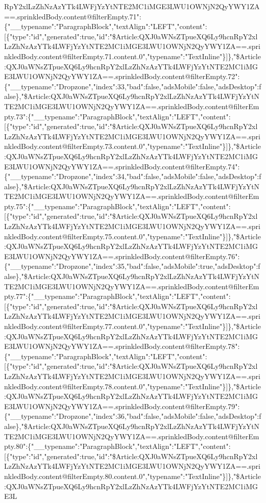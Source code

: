 RpY2xlLzZhNzAzYTk4LWFjYzYtNTE2MC1iMGE3LWU1OWNjN2QyYWY1ZA==.sprinkledBody.content@filterEmpty.71":\{"\_\_typename":"ParagraphBlock","textAlign":"LEFT","content":{[}\{"type":"id","generated":true,"id":"\$Article:QXJ0aWNsZTpueXQ6Ly9hcnRpY2xlLzZhNzAzYTk4LWFjYzYtNTE2MC1iMGE3LWU1OWNjN2QyYWY1ZA==.sprinkledBody.content@filterEmpty.71.content.0","typename":"TextInline"\}{]}\},"\$Article:QXJ0aWNsZTpueXQ6Ly9hcnRpY2xlLzZhNzAzYTk4LWFjYzYtNTE2MC1iMGE3LWU1OWNjN2QyYWY1ZA==.sprinkledBody.content@filterEmpty.72":\{"\_\_typename":"Dropzone","index":33,"bad":false,"adsMobile":false,"adsDesktop":false\},"\$Article:QXJ0aWNsZTpueXQ6Ly9hcnRpY2xlLzZhNzAzYTk4LWFjYzYtNTE2MC1iMGE3LWU1OWNjN2QyYWY1ZA==.sprinkledBody.content@filterEmpty.73":\{"\_\_typename":"ParagraphBlock","textAlign":"LEFT","content":{[}\{"type":"id","generated":true,"id":"\$Article:QXJ0aWNsZTpueXQ6Ly9hcnRpY2xlLzZhNzAzYTk4LWFjYzYtNTE2MC1iMGE3LWU1OWNjN2QyYWY1ZA==.sprinkledBody.content@filterEmpty.73.content.0","typename":"TextInline"\}{]}\},"\$Article:QXJ0aWNsZTpueXQ6Ly9hcnRpY2xlLzZhNzAzYTk4LWFjYzYtNTE2MC1iMGE3LWU1OWNjN2QyYWY1ZA==.sprinkledBody.content@filterEmpty.74":\{"\_\_typename":"Dropzone","index":34,"bad":false,"adsMobile":false,"adsDesktop":false\},"\$Article:QXJ0aWNsZTpueXQ6Ly9hcnRpY2xlLzZhNzAzYTk4LWFjYzYtNTE2MC1iMGE3LWU1OWNjN2QyYWY1ZA==.sprinkledBody.content@filterEmpty.75":\{"\_\_typename":"ParagraphBlock","textAlign":"LEFT","content":{[}\{"type":"id","generated":true,"id":"\$Article:QXJ0aWNsZTpueXQ6Ly9hcnRpY2xlLzZhNzAzYTk4LWFjYzYtNTE2MC1iMGE3LWU1OWNjN2QyYWY1ZA==.sprinkledBody.content@filterEmpty.75.content.0","typename":"TextInline"\}{]}\},"\$Article:QXJ0aWNsZTpueXQ6Ly9hcnRpY2xlLzZhNzAzYTk4LWFjYzYtNTE2MC1iMGE3LWU1OWNjN2QyYWY1ZA==.sprinkledBody.content@filterEmpty.76":\{"\_\_typename":"Dropzone","index":35,"bad":false,"adsMobile":true,"adsDesktop":false\},"\$Article:QXJ0aWNsZTpueXQ6Ly9hcnRpY2xlLzZhNzAzYTk4LWFjYzYtNTE2MC1iMGE3LWU1OWNjN2QyYWY1ZA==.sprinkledBody.content@filterEmpty.77":\{"\_\_typename":"ParagraphBlock","textAlign":"LEFT","content":{[}\{"type":"id","generated":true,"id":"\$Article:QXJ0aWNsZTpueXQ6Ly9hcnRpY2xlLzZhNzAzYTk4LWFjYzYtNTE2MC1iMGE3LWU1OWNjN2QyYWY1ZA==.sprinkledBody.content@filterEmpty.77.content.0","typename":"TextInline"\}{]}\},"\$Article:QXJ0aWNsZTpueXQ6Ly9hcnRpY2xlLzZhNzAzYTk4LWFjYzYtNTE2MC1iMGE3LWU1OWNjN2QyYWY1ZA==.sprinkledBody.content@filterEmpty.78":\{"\_\_typename":"ParagraphBlock","textAlign":"LEFT","content":{[}\{"type":"id","generated":true,"id":"\$Article:QXJ0aWNsZTpueXQ6Ly9hcnRpY2xlLzZhNzAzYTk4LWFjYzYtNTE2MC1iMGE3LWU1OWNjN2QyYWY1ZA==.sprinkledBody.content@filterEmpty.78.content.0","typename":"TextInline"\}{]}\},"\$Article:QXJ0aWNsZTpueXQ6Ly9hcnRpY2xlLzZhNzAzYTk4LWFjYzYtNTE2MC1iMGE3LWU1OWNjN2QyYWY1ZA==.sprinkledBody.content@filterEmpty.79":\{"\_\_typename":"Dropzone","index":36,"bad":false,"adsMobile":false,"adsDesktop":false\},"\$Article:QXJ0aWNsZTpueXQ6Ly9hcnRpY2xlLzZhNzAzYTk4LWFjYzYtNTE2MC1iMGE3LWU1OWNjN2QyYWY1ZA==.sprinkledBody.content@filterEmpty.80":\{"\_\_typename":"ParagraphBlock","textAlign":"LEFT","content":{[}\{"type":"id","generated":true,"id":"\$Article:QXJ0aWNsZTpueXQ6Ly9hcnRpY2xlLzZhNzAzYTk4LWFjYzYtNTE2MC1iMGE3LWU1OWNjN2QyYWY1ZA==.sprinkledBody.content@filterEmpty.80.content.0","typename":"TextInline"\}{]}\},"\$Article:QXJ0aWNsZTpueXQ6Ly9hcnRpY2xlLzZhNzAzYTk4LWFjYzYtNTE2MC1iMGE3L